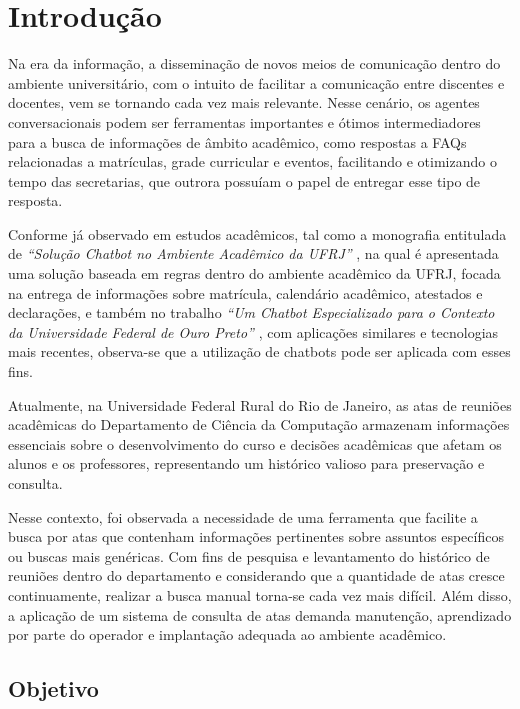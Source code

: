\chapter{Introdução}\label{chp:INTRODUCAO}

Na era da informação, a disseminação de novos meios de comunicação dentro do ambiente universitário, com o intuito de facilitar a comunicação entre discentes e docentes, vem se tornando cada vez mais relevante. Nesse cenário, os agentes conversacionais podem ser ferramentas importantes e ótimos intermediadores para a busca de informações de âmbito acadêmico, como respostas a FAQs relacionadas a matrículas, grade curricular e eventos, facilitando e otimizando o tempo das secretarias, que outrora possuíam o papel de entregar esse tipo de resposta.

Conforme já observado em estudos acadêmicos, tal como a monografia entitulada de \textit{``Solução Chatbot no Ambiente Acadêmico da UFRJ''} \cite{ufrj}, na qual é apresentada uma solução baseada em regras dentro do ambiente acadêmico da UFRJ, focada na entrega de informações sobre matrícula, calendário acadêmico, atestados e declarações, e também no trabalho \textit{``Um Chatbot Especializado para o Contexto da Universidade Federal de Ouro Preto''} \cite{ufop}, com aplicações similares e tecnologias mais recentes, observa-se que a utilização de chatbots pode ser aplicada com esses fins.

Atualmente, na Universidade Federal Rural do Rio de Janeiro, as atas de reuniões acadêmicas do Departamento de Ciência da Computação armazenam informações essenciais sobre o desenvolvimento do curso e decisões acadêmicas que afetam os alunos e os professores, representando um histórico valioso para preservação e consulta.

Nesse contexto, foi observada a necessidade de uma ferramenta que facilite a busca por atas que contenham informações pertinentes sobre assuntos específicos ou buscas mais genéricas. Com fins de pesquisa e levantamento do histórico de reuniões dentro do departamento e considerando que a quantidade de atas cresce continuamente, realizar a busca manual torna-se cada vez mais difícil. Além disso, a aplicação de um sistema de consulta de atas demanda manutenção, aprendizado por parte do operador e implantação adequada ao ambiente acadêmico.

\section{Objetivo}


